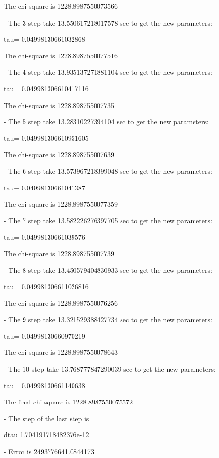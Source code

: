 \documentclass[showpacs, oneside, onecolumn, prl, amsmath, amssymb, nofootinbib, superscriptaddress, notitlepage]{revtex4-1}
\begin{document}
The chi-square is 1228.8987550073566


- The 3 step take  13.550617218017578 sec to get the new parameters:

tau= 0.04998130661032868

The chi-square is 1228.8987550077516


- The 4 step take  13.935137271881104 sec to get the new parameters:

tau= 0.049981306610417116

The chi-square is 1228.898755007735


- The 5 step take  13.28310227394104 sec to get the new parameters:

tau= 0.049981306610951605

The chi-square is 1228.898755007639


- The 6 step take  13.573967218399048 sec to get the new parameters:

tau= 0.04998130661041387

The chi-square is 1228.8987550077359


- The 7 step take  13.582226276397705 sec to get the new parameters:

tau= 0.04998130661039576

The chi-square is 1228.898755007739


- The 8 step take  13.450579404830933 sec to get the new parameters:

tau= 0.049981306611026816

The chi-square is 1228.8987550076256


- The 9 step take  13.321529388427734 sec to get the new parameters:

tau= 0.04998130660970219

The chi-square is 1228.8987550078643


- The 10 step take  13.768777847290039 sec to get the new parameters:

tau= 0.04998130661140638

The final chi-square is 1228.8987550075572


- The step of the last step is 

dtau 1.704191718482376e-12


- Error is  2493776641.0844173

~~~~
\end{document}
